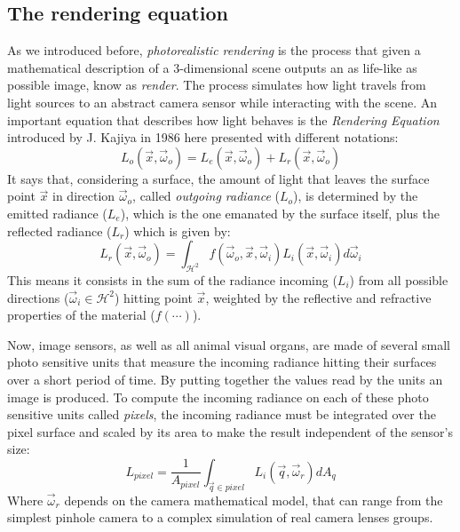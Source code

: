 \subsection{The rendering equation}
\label{secrendeq}
As we introduced before, \textit{photorealistic rendering} is the process that given a mathematical description of a 3-dimensional scene outputs an as life-like as possible image, know as \textit{render}. The process simulates how light travels from light sources to an abstract camera sensor while interacting with the scene. An important equation that describes how light behaves is the \textit{Rendering Equation} introduced by J. Kajiya in 1986 \cite{kajiya1986rendering} here presented with different notations:
\begin{equation}
	L_o(\vec{x},\vec{\omega}_o) = 
		L_e(\vec{x},\vec{\omega}_o) + 
		L_r(\vec{x},\vec{\omega}_o)
	\label{rendeqeasy}
\end{equation}
It says that, considering a surface, the amount of light that leaves the surface point $\vec{x}$ in direction $\vec{\omega}_o$, called \textit{outgoing radiance} ($L_o$), is determined by the emitted radiance ($L_e$), which is the one emanated by the surface itself, plus the reflected radiance ($L_r$) which is given by:
\begin{equation}
	L_r(\vec{x},\vec{\omega}_o) = 
		\int_{\mathcal{H}^2} 
			f(\vec{\omega}_o, \vec{x}, \vec{\omega}_i)
			L_i(\vec{x},\vec{\omega}_i)
			d\vec{\omega}_i
	\label{reflectioneq}
\end{equation}
This means it consists in the sum of the radiance incoming ($L_i$) from all possible directions ($\vec{\omega}_i \in \mathcal{H}^2$) hitting point $\vec{x}$, weighted by the reflective and refractive properties of the material ($f(\cdots)$).

Now, image sensors, as well as all animal visual organs, are made of several small photo sensitive units that measure the incoming radiance hitting their surfaces over a short period of time. By putting together the values read by the units an image is produced. To compute the incoming radiance on each of these photo sensitive units called \textit{pixels}, the incoming radiance must be integrated over the pixel surface and scaled by its area to make the result independent of the sensor's size:
\begin{equation}
	L_{pixel} = \frac{1}{A_{pixel}} 
		\int_{\vec{q}\in pixel} L_i(\vec{q}, \vec{\omega}_r)dA_q
	\label{pixelradiance}
\end{equation}
Where $\vec{\omega}_r$ depends on the camera mathematical model, that can range from the simplest pinhole camera to a complex simulation of real camera lenses groups.

